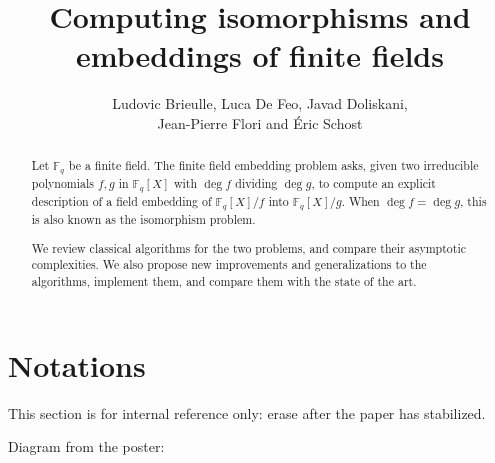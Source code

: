 \documentclass[12pt]{article}
\title{Computing isomorphisms and embeddings of finite fields}
\author{Ludovic Brieulle, Luca De Feo, Javad Doliskani,\\ Jean-Pierre
  Flori and \'Eric Schost}
\theoremstyle{plain}
\theoremstyle{definition}
\def\F{\ensuremath{\mathbb{F}}}
\newcounter{algorithm}
\begin{document}
\maketitle
\begin{abstract}
  Let $\F_q$ be a finite field.  The finite field embedding problem
  asks, given two irreducible polynomials $f,g$ in $\F_q[X]$ with
  $\deg f$ dividing $\deg g$, to compute an explicit description of a
  field embedding of $\F_q[X]/f$ into $\F_q[X]/g$. When $\deg f = \deg
  g$, this is also known as the isomorphism problem.
  
  We review classical algorithms for the two problems, and compare
  their asymptotic complexities. We also propose new improvements and
  generalizations to the algorithms, implement them, and compare them
  with the state of the art.
\end{abstract}


\section*{Notations}

\def\poster{\textbf{Poster}}
\def\rains{\textbf{Rains}}
\def\kummer{\textbf{Kummer}}
\def\cons{\textbf{consensual}}
\def\prop{\textbf{proposed}}

This section is for internal reference only: erase after the paper has
stabilized.


Diagram from the poster:

\end{document}
